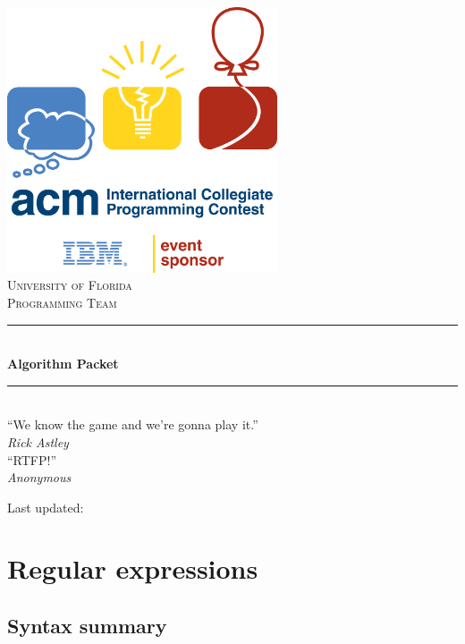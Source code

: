 \documentclass[a4paper,12pt]{article}
\begin{document}
\begin{titlepage}
\begin{center}
\includegraphics[width=0.6\textwidth]{icpc.png}\\[2cm]
\textsc{\LARGE University of Florida}\\[0.5cm]
\textsc{\Large Programming Team}\\[0.5cm]
 
\rule{\linewidth}{0.5mm}\\[0.4cm]
{\huge \bfseries Algorithm Packet}\\[0.2cm]
\rule{\linewidth}{0.5mm}\\[2cm]

``We know the game and we're gonna play it.''\\{\em Rick Astley}
\\[1cm]
``RTFP!''\\{\em Anonymous}

\vfill

{\large Last updated: }

\end{center}

\end{titlepage}

\tableofcontents

\newpage\section{Regular expressions}

\subsection{Syntax summary}
\end{document}
